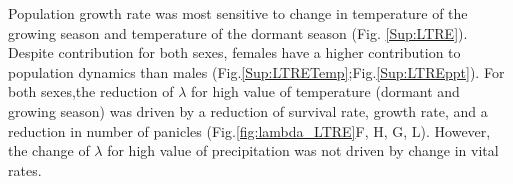 \documentclass[12pt]{article}
\begin{document}
Population growth rate was most sensitive to change in temperature of the growing season and temperature of the dormant season (Fig. \ref{Sup:LTRE}).
Despite contribution for both sexes, females have a higher contribution to population dynamics than males (Fig.\ref{Sup:LTRETemp};Fig.\ref{Sup:LTREppt}).
For both sexes,the reduction of $\lambda$ for high value of temperature  (dormant and growing season) was driven by a reduction of survival rate, growth rate, and a reduction in number of panicles (Fig.\ref{fig:lambda_LTRE}F, H, G, L).
However, the change of $\lambda$ for high value of precipitation was not driven by change in vital rates.
\end{document}
